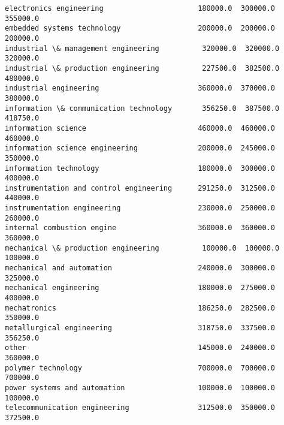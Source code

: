 \documentclass[11pt]{article}
\begin{document}
\begin{tcolorbox}[breakable, size=fbox, boxrule=.5pt, pad at break*=1mm, opacityfill=0]
\begin{Verbatim}[commandchars=\\\{\}]
electronics engineering                      180000.0  300000.0  355000.0
embedded systems technology                  200000.0  200000.0  200000.0
industrial \& management engineering          320000.0  320000.0  320000.0
industrial \& production engineering          227500.0  382500.0  480000.0
industrial engineering                       360000.0  370000.0  380000.0
information \& communication technology       356250.0  387500.0  418750.0
information science                          460000.0  460000.0  460000.0
information science engineering              200000.0  245000.0  350000.0
information technology                       180000.0  300000.0  400000.0
instrumentation and control engineering      291250.0  312500.0  440000.0
instrumentation engineering                  230000.0  250000.0  260000.0
internal combustion engine                   360000.0  360000.0  360000.0
mechanical \& production engineering          100000.0  100000.0  100000.0
mechanical and automation                    240000.0  300000.0  325000.0
mechanical engineering                       180000.0  275000.0  400000.0
mechatronics                                 186250.0  282500.0  350000.0
metallurgical engineering                    318750.0  337500.0  356250.0
other                                        145000.0  240000.0  360000.0
polymer technology                           700000.0  700000.0  700000.0
power systems and automation                 100000.0  100000.0  100000.0
telecommunication engineering                312500.0  350000.0  372500.0


\end{Verbatim}
\end{tcolorbox}
\end{document}
